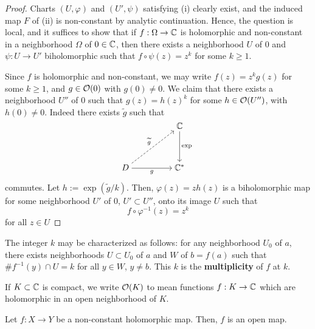 \documentclass[11pt]{article}
\begin{document}
\begin{proof}
    Charts $(U,\varphi)$ and $(U', \psi)$ satisfying (i) clearly exist, and the induced map $F$ of (ii) is non-constant by analytic continuation. Hence, the question is local, and it suffices to show that if $f: \Omega \to \mathbb{C}$ is holomorphic and non-constant in a neighborhood $\Omega$ of $0 \in \mathbb{C}$, then there exists a neighborhood $U$ of $0$ and $\psi : U \to U'$ biholomorphic such that $f \circ \psi(z) = z^k$ for some $k \geq 1$.

    Since $f$ is holomorphic and non-constant, we may write $f(z) = z^k g(z)$ for some $k \geq 1$, and $g \in \mathcal O(0)$ with $g(0) \neq 0$. We claim that there exists a neighborhood $U''$ of $0$ such that $g(z)=h(z)^k$ for some $h\in \mathcal O(U'')$, with $h(0) \neq 0$. Indeed there exists $\tilde g$ such that
\[\begin{tikzcd}[ampersand replacement=\&,cramped]
	\&\& \C \\
	\\
	D \&\& {\C^*}
	\arrow["\exp", from=1-3, to=3-3]
	\arrow["{\tilde g}", dashed, from=3-1, to=1-3]
	\arrow["g"', from=3-1, to=3-3]
\end{tikzcd}\]
commutes. Let $h:= \exp(\tilde g/k)$. Then, $\varphi(z) = zh(z)$ is a biholomorphic map for some neighborhood $U'$ of $0$, $U' \subset U''$, onto its image $U$ such that
$$f \circ \varphi^{-1}(z) = z^k$$
for all $z \in U$
\end{proof}

\begin{rmk}
    The integer $k$ may be characterized as follows: for any neighborhood $U_0$ of $a$, there exists neighborhoods $U \subset U_0$ of $a$ and $W$ of $b=f(a)$ such that $\#f^{-1}(y) \cap U = k$ for all $y \in W$, $y \neq b$. This $k$ is the \textbf{multiplicity} of $f$ at $k$.
    \end{rmk}

\begin{notethm*}[Notation]
    If $K \subset \mathbb{C}$ is compact, we write $\mathcal O(K)$ to mean functions $f:K \to \mathbb{C}$ which are holomorphic in an open neighborhood of $K$.
\end{notethm*}

\begin{cor}[][label=cor:openhol]
    Let $f:X \to Y$ be a non-constant holomorphic map. Then, $f$ is an open map.
\end{cor}
\end{document}
